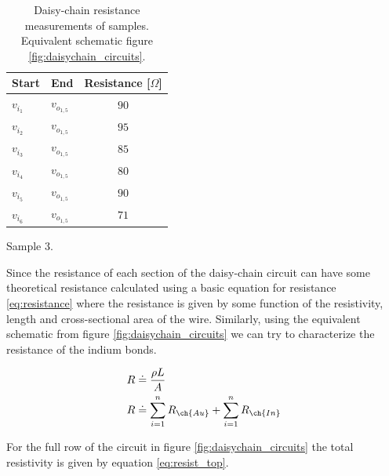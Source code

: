 \begin{table}
\begin{subtable}[t]{0.3\textwidth}
\begin{tabular}{| l | l | c |}
            \hline
            Start & End & Resistance [$\Omega$] \\
            \hline
            \hline
            $v_{i_1}$ & $v_{o_{1,5}}$ & $90$ \\
            $v_{i_2}$ & $v_{o_{1,5}}$ & $95$ \\
            $v_{i_3}$ & $v_{o_{1,5}}$ & $85$ \\
            $v_{i_4}$ & $v_{o_{1,5}}$ & $80$ \\
            $v_{i_5}$ & $v_{o_{1,5}}$ & $90$ \\
            $v_{i_6}$ & $v_{o_{1,5}}$ & $71$ \\
            \hline
        \end{tabular}
        \caption{Sample 3.}
    \end{subtable}
    \caption{Daisy-chain resistance measurements of samples. Equivalent schematic figure \ref{fig:daisychain_circuits}.}
    \label{tab:daisychain_resistance_table}
\end{table}

Since the resistance of each section of the daisy-chain circuit can have some theoretical resistance calculated using a basic equation for resistance \ref{eq:resistance} where the resistance is given by some function of the resistivity, length and cross-sectional area of the wire. Similarly, using the equivalent schematic from figure \ref{fig:daisychain_circuits} we can try to characterize the resistance of the indium bonds.



\begin{equation}
    \begin{split}
        R &\doteq \frac{\rho L}{A} \\
        R &\doteq \sum^n_{i=1} R_{\ch{Au}} + \sum^n_{i=1} R_{\ch{In}}
    \end{split}
    \label{eq:resistance}
\end{equation}

For the full row of the circuit in figure \ref{fig:daisychain_circuits} the total resistivity is given by equation \ref{eq:resist_top}.

